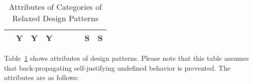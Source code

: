 \documentclass[10]{article}
\begin{document}
\begin{table}
\begin{tabular}{lcccccccc}
				&  Y &  Y &   Y  & \x & \x & \x &   S &  S \\
	\bottomrule
\end{tabular}
\caption{Attributes of Categories of Relaxed Design Patterns}
\label{tab:Attributes of Categories of Relaxed Design Patterns}
\end{table}

Table~\ref{tab:Attributes of Categories of Relaxed Design Patterns}
shows attributes of design patterns.
Please note that this table assumes that back-propagating self-justifying
undefined behavior is prevented.
The attributes are as follows:
\end{document}
